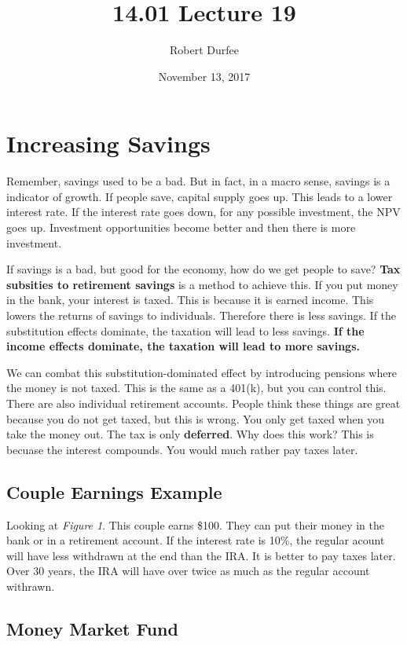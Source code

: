 \documentclass{article}
\title{ 14.01 Lecture 19 }
\author{ Robert Durfee }
\date{ November 13, 2017 }
\begin{document}
\maketitle

\section{ Increasing Savings }

Remember, savings used to be a bad. But in fact, in a macro sense, savings is a
indicator of growth. If people save, capital supply goes up. This leads to a
lower interest rate. If the interest rate goes down, for any possible
investment, the NPV goes up. Investment opportunities become better and then
there is more investment.

If savings is a bad, but good for the economy, how do we get people to save?
\textbf{Tax subsities to retirement savings} is a method to achieve this. If you
put money in the bank, your interest is taxed. This is because it is earned
income. This lowers the returns of savings to individuals. Therefore there is
less savings. If the substitution effects dominate, the taxation will lead to
less savings. \textbf{If the income effects dominate, the taxation will lead to
more savings.}

We can combat this substitution-dominated effect by introducing pensions where
the money is not taxed. This is the same as a 401(k), but you can control this.
There are also individual retirement accounts. People think these things are
great because you do not get taxed, but this is wrong. You only get taxed when
you take the money out. The tax is only \textbf{deferred}. Why does this work?
This is becuase the interest compounds. You would much rather pay taxes later.

\subsection{Couple Earnings Example}

Looking at \textit{Figure 1}. This couple earns  \$100. They can put their money
in the bank or in a retirement account. If the interest rate is 10\%, the
regular acount will have less withdrawn at the end than the IRA. It is better to
pay taxes later. Over 30 years, the IRA will have over twice as much as the
regular account withrawn.

\subsection{Money Market Fund}
\end{document}
